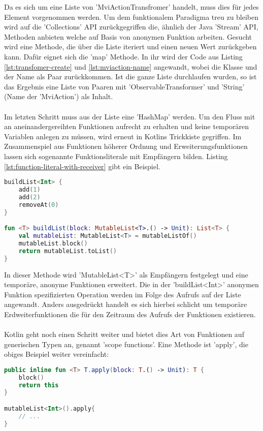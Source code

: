 \bigskip
Da es sich um eine Liste von 'MviActionTransfromer' handelt, muss dies für jedes Element vorgenommen werden. Um dem funktionalem Paradigma treu zu bleiben wird auf die 'Collections' API zurückgegriffen die, ähnlich der Java 'Stream' API, Methoden anbieten welche auf Basis von anonymen Funktion arbeiten.
Gesucht wird eine Methode, die über die Liste iteriert und einen neuen Wert zurückgeben kann. Dafür eignet sich die 'map' Methode. In ihr wird der Code aus Listing
\ref{lst:transfomer-create}
und
\ref{lst:mviaction-name}
angewandt, wobei die Klasse und der Name als Paar zurückkommen. Ist die ganze Liste durchlaufen wurden, so ist das Ergebnis eine Liste von Paaren mit 'ObservableTransformer' und 'String' (Name der 'MviAction') als Inhalt.
\\\\
Im letzten Schritt muss aus der Liste eine 'HashMap' werden. Um den Fluss mit an aneinandergereihten Funktionen aufrecht zu erhalten und keine temporären Variablen anlegen zu müssen, wird erneut in Kotlins Trickkiste gegriffen. Im Zusammenspiel aus Funktionen höherer Ordnung und Erweiterungsfunktionen lassen sich sogenannte Funktionsliterale mit Empfängern bilden. Listing
\ref{lst:function-literal-with-receiver}
gibt ein Beispiel.
\begin{lstlisting}[caption={Funktionsliteral mit Empfänger}, label={lst:function-literal-with-receiver},language=Kotlin]
buildList<Int> {
	add(1)
	add(2)
	removeAt(0)
}

fun <T> buildList(block: MutableList<T>.() -> Unit): List<T> {
	val mutableList: MutableList<T> = mutableListOf()
	mutableList.block()
	return mutableList.toList()
}
\end{lstlisting}
\bigskip
In dieser Methode wird 'MutableList<T>' als Empfängern festgelegt und eine temporäre, anonyme Funktionen erweitert. Die in der 'buildList<Int>' anonymen Funktion spezifizierten Operation werden im Folge des Aufrufs auf der Liste angewandt. Anders ausgedrückt handelt es sich hierbei schlicht um temporäre Erdweiterfunktionen die für den Zeitraum des Aufrufs der Funktionen existieren.
\\\\
Kotlin geht noch einen Schritt weiter und bietet dies Art von Funktionen auf generischen Typen an, genannt 'scope functions'. Eine Methode ist 'apply', die obiges Beispiel weiter vereinfacht:
\begin{lstlisting}[caption={apply Funktion}, label={lst:apply-function},language=Kotlin]
public inline fun <T> T.apply(block: T.() -> Unit): T {
	block()
	return this
}

mutableList<Int>().apply{
	// ...
}
\end{lstlisting}
